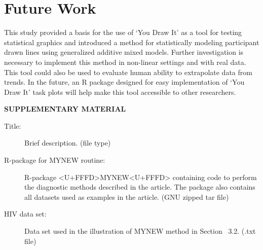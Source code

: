 \documentclass[12pt]{article}
\begin{document}
\hypertarget{future-work}{%
\section{Future Work}\label{future-work}}

This study provided a basis for the use of `You Draw It' as a tool for
testing statistical graphics and introduced a method for statistically
modeling participant drawn lines using generalized additive mixed
models. Further investigation is necessary to implement this method in
non-linear settings and with real data. This tool could also be used to
evaluate human ability to extrapolate data from trends. In the future,
an R package designed for easy implementation of `You Draw It' task
plots will help make this tool accessible to other researchers.

\begin{center}
{\large\bf SUPPLEMENTARY MATERIAL}
\end{center}

\begin{description}

\item[Title:] Brief description. (file type)

\item[R-package for  MYNEW routine:] R-package <U+FFFD>MYNEW<U+FFFD> containing code to perform the diagnostic methods described in the article. The package also contains all datasets used as examples in the article. (GNU zipped tar file)

\item[HIV data set:] Data set used in the illustration of MYNEW method in Section~ 3.2. (.txt file)

\end{description}



\end{document}
